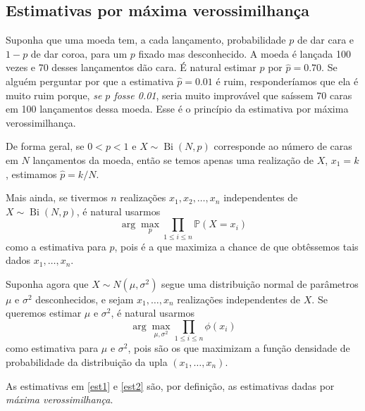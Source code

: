 \subsection{Estimativas por máxima verossimilhança}

Suponha que uma moeda tem, a cada lançamento, probabilidade $p$ de dar cara e $1-p$ de dar coroa, para um $p$ fixado mas desconhecido. A moeda é lançada 100 vezes e 70 desses lançamentos dão cara. É natural estimar $p$ por $\hat{p} = 0.70$. Se alguém perguntar por que a estimativa $\hat{p} = 0.01$ é ruim, responderíamos que ela é muito ruim porque, \emph{se $p$ fosse 0.01}, seria muito improvável que saíssem 70 caras em 100 lançamentos dessa moeda. Esse é o princípio da estimativa por máxima verossimilhança.

De forma geral, se $0<p<1$ e $X\sim \operatorname{Bi}(N,p)$ corresponde ao número de caras em $N$ lançamentos da moeda, então se temos apenas uma realização de $X$, $x_1 = k$, estimamos $\hat{p} = k/N$.

Mais ainda, se tivermos $n$ realizações $x_1, x_2, \dotsc, x_n$ independentes de $X\sim \operatorname{Bi}(N,p)$, é natural usarmos
\begin{equation}
	\label{est1}
	\arg\max_p\prod_{1\leq i\leq n} \mathbb{P}(X = x_i)
\end{equation}
como a estimativa para $p$, pois é a que maximiza a chance de que obtêssemos tais dados $x_1, \dotsc, x_n$.

Suponha agora que $X\sim N(\mu, \sigma^2)$ segue uma distribuição normal de parâmetros $\mu$ e $\sigma^2$ desconhecidos, e sejam $x_1, \dotsc, x_n$ realizações independentes de $X$. Se queremos estimar $\mu$ e $\sigma^2$, é natural usarmos
\begin{equation}
	\label{est2}
	\arg\max_{\mu, \sigma^2}\prod_{1\leq i\leq n} \phi(x_i)
\end{equation}
como estimativa para $\mu$ e $\sigma^2$, pois são os que maximizam a função densidade de probabilidade da distribuição da upla $(x_1,\dotsc,x_n)$.

As estimativas em \eqref{est1} e \eqref{est2} são, por definição, as estimativas dadas por \emph{máxima verossimilhança}.













